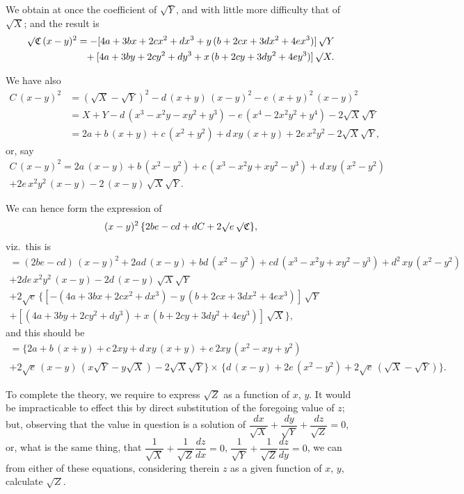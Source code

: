 \documentclass[12pt,a4paper]{article}
\begin{document}
We obtain at once the coefficient of $\surd Y$, and with little more difficulty that of $\surd X$; and the result is
\begin{align*}
\surd\mathfrak{C}\,(x-y)^2 &= -[4a + 3bx + 2cx^2 + dx^3 + y\,(b+2cx+3dx^2+4ex^3)]\,\surd Y \\
&\phantom{=} + [4a + 3by + 2cy^2 + dy^3 + x\,(b+2cy+3dy^2+4ey^3)]\,\surd X.
\end{align*}

\newpage

\noindent
We have also
\begin{align*}
C\,(x-y)^2 &= (\surd X - \surd Y)^2 - d\,(x+y)\,(x-y)^2 - e\,(x+y)^2\,(x-y)^2 \\
&= X + Y - d\,(x^3-x^2y-xy^2+y^3) - e\,(x^4-2x^2y^2+y^4) - 2\surd X\surd Y \\
&= 2a + b\,(x+y) + c\,(x^2+y^2) + d\,xy\,(x+y) + 2e\,x^2y^2 - 2\surd X\surd Y,
\end{align*}
or, say
\begin{multline*}
C\,(x-y)^2 = 2a\,(x-y) + b\,(x^2-y^2) + c\,(x^3-x^2y+xy^2-y^3) + d\,xy\,(x^2-y^2) \\ + 2e\,x^2y^2\,(x-y) - 2\,(x-y)\,\surd X\surd Y.
\end{multline*}

We can hence form the expression of
\[
(x-y)^2\,\{2be - cd + dC + 2\surd e\,\surd\mathfrak{C}\},
\]
viz.\ this is
\begin{multline*}
= (2be-cd)\,(x-y)^2 + 2ad\,(x-y) + bd\,(x^2-y^2) + cd\,(x^3-x^2y+xy^2-y^3) + d^2\,xy\,(x^2-y^2) \\ + 2de\,x^2y^2\,(x-y) - 2d\,(x-y)\,\surd X\surd Y \\
+ 2\surd e\,\{[-(4a+3bx+2cx^2+dx^3) - y\,(b+2cx+3dx^2+4ex^3)]\,\surd Y \\
+ [(4a+3by+2cy^2+dy^3) + x\,(b+2cy+3dy^2+4ey^3)]\,\surd X\},
\end{multline*}
and this should be
\begin{multline*}
= \{2a+b\,(x+y)+c\,2xy+d\,xy\,(x+y)+e\,2xy\,(x^2-xy+y^2) \\
+ 2\surd e\,(x-y)\,(x\surd Y-y\surd X) - 2\surd X\surd Y\} \times\,\{d\,(x-y)+2e\,(x^2-y^2)+2\surd e\,(\surd X-\surd Y)\}.
\end{multline*}

To complete the theory, we require to express $\surd Z$ as a function of $x$, $y$. It would be impracticable to effect this by direct substitution of the foregoing value of $z$; but, observing that the value in question is a solution of $\dfrac{dx}{\surd X} + \dfrac{dy}{\surd Y} + \dfrac{dz}{\surd Z} = 0$, or, what is the same thing, that $\dfrac{1}{\surd X} + \dfrac{1}{\surd Z}\dfrac{dz}{dx} = 0$, $\dfrac{1}{\surd Y} + \dfrac{1}{\surd Z}\dfrac{dz}{dy} = 0$, we can from either of these equations, considering therein $z$ as a given function of $x$, $y$, calculate $\surd Z$.
\end{document}
